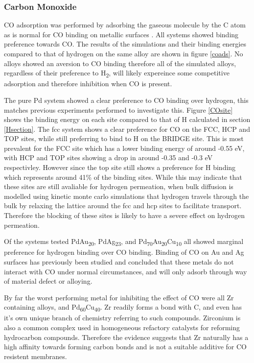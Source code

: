 \subsubsection{Carbon Monoxide}
CO adsorption was performed by adsorbing the gaseous molecule by the C atom as is normal for CO binding on metallic surfaces \cite{doi:10.1021/acscatal.8b02371}. All systems showed binding preference towards CO. The results of the simulations and their binding energies compared to that of hydrogen on the same alloy are shown in figure \ref{coads}.  No alloys showed an aversion to CO binding therefore all of the simulated alloys, regardless of their preference to H\textsubscript{2}, will likely expereince some competitive adsorption and therefore inhibition when CO is present. 

The pure Pd system showed a clear preference to CO binding over hydrogen, this matches previous experiments performed to investigate this. \cite{Xu2016a} Figure \ref{COsite} shows the binding energy on each site compared to that of H calculated in section \ref{Hsection}. The fcc system shows a clear preference for CO on the FCC, HCP and TOP sites, while still preferring to bind to H on the BRIDGE site. This is most prevalent for the FCC site which has a lower binding energy of around -0.55 eV, with HCP and TOP sites showing a drop in around -0.35 and -0.3 eV respectivley. However since the top site still shows a preference for H binding which represents around 41\% of the binding sites. While this may indicate that these sites are still avaliable for hydrogen permeation, when bulk diffusion is modelled using kinetic monte carlo simulations that hydrogen travels through the bulk by relaxing the lattice around the fcc and hcp sites to facilitate transport. \cite{Qin2012} Therefore the blocking of these sites is likely to have a severe effect on hydrogen permeation.

Of the systems tested PdAu\textsubscript{20}, PdAg\textsubscript{23}, and Pd\textsubscript{70}Au\textsubscript{20}Cu\textsubscript{10} all showed marginal preference for hydrogen binding over CO binding. Binding of CO on Au and Ag surfaces has previously been studied and concluded that these metals do not interact with CO under normal circumstances, and will only adsorb through way of material defect or alloying. \cite{doi:10.1021/la950167j} \cite{shaikhutdinov_meyer_naschitzki_baumer_freund_2003}

By far the worst performing metal for inhibiting the effect of CO were all Zr containing alloys, and Pd\textsubscript{60}Cu\textsubscript{40}. Zr readily forms a bond with C, and even has it's own unique branch of chemistry referring to such compounds.\cite{doi:10.1021/cen-v082n016.p036} Zirconium is also a common complex used in homogeneous refactory catalysts for reforming hydrocarbon compounds.\cite{doi:10.1002/9780470504437.ch1} Therefore the evidence suggests that Zr naturally has a high affinity towards forming carbon bonds and is not a suitable additive for CO resistent membranes. 

